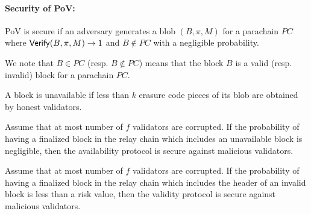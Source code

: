 \paragraph{Security of PoV:} PoV is secure if an adversary generates a blob $(B,\pi,M)$ for a parachain $PC$ where  $\mathsf{Verify}(B,\pi,M) \rightarrow 1$ and $B \notin PC$ with a negligible probability.


We note that $B\in PC$ (resp. $B \notin PC$) means that the block $B$ is a valid (resp. invalid) block for a parachain $PC$.


\begin{definition}\label{def:unavail}
A block is unavailable if less than $k$ erasure code pieces of its blob are obtained by honest validators.
\end{definition}


\begin{definition}
Assume that at most number of $f$ validators are corrupted. If the probability of having a finalized block in the relay chain which includes an unavailable block is negligible, then the availability protocol is secure against malicious validators.
\end{definition}

\begin{definition}
Assume that  at most number of $f$ validators are corrupted. If the probability of having a finalized block in the relay chain which includes the header of an invalid block is less than a risk value, then the validity protocol is secure against malicious validators.
\end{definition}






